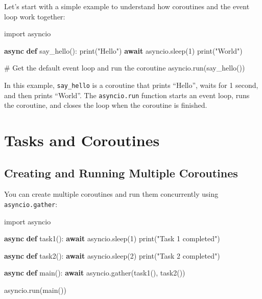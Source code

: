 \documentclass[
  letterpaper,
  DIV=11,
  numbers=noendperiod]{scrreprt}
\newenvironment{Shaded}{\begin{snugshade}}{\end{snugshade}}
\newcommand{\BuiltInTok}[1]{\textcolor[rgb]{0.00,0.23,0.31}{#1}}
\newcommand{\CommentTok}[1]{\textcolor[rgb]{0.37,0.37,0.37}{#1}}
\newcommand{\ControlFlowTok}[1]{\textcolor[rgb]{0.00,0.23,0.31}{\textbf{#1}}}
\newcommand{\DecValTok}[1]{\textcolor[rgb]{0.68,0.00,0.00}{#1}}
\newcommand{\ImportTok}[1]{\textcolor[rgb]{0.00,0.46,0.62}{#1}}
\newcommand{\KeywordTok}[1]{\textcolor[rgb]{0.00,0.23,0.31}{\textbf{#1}}}
\newcommand{\NormalTok}[1]{\textcolor[rgb]{0.00,0.23,0.31}{#1}}
\newcommand{\StringTok}[1]{\textcolor[rgb]{0.13,0.47,0.30}{#1}}
\begin{document}
Let's start with a simple example to understand how coroutines and the
event loop work together:

\begin{Shaded}
\begin{Highlighting}[]
\ImportTok{import}\NormalTok{ asyncio}

\ControlFlowTok{async} \KeywordTok{def}\NormalTok{ say\_hello():}
    \BuiltInTok{print}\NormalTok{(}\StringTok{"Hello"}\NormalTok{)}
    \ControlFlowTok{await}\NormalTok{ asyncio.sleep(}\DecValTok{1}\NormalTok{)}
    \BuiltInTok{print}\NormalTok{(}\StringTok{"World"}\NormalTok{)}

\CommentTok{\# Get the default event loop and run the coroutine}
\NormalTok{asyncio.run(say\_hello())}
\end{Highlighting}
\end{Shaded}

In this example, \texttt{say\_hello} is a coroutine that prints
``Hello'', waits for 1 second, and then prints ``World''. The
\texttt{asyncio.run} function starts an event loop, runs the coroutine,
and closes the loop when the coroutine is finished.

\section{Tasks and Coroutines}\label{tasks-and-coroutines}

\subsection{Creating and Running Multiple
Coroutines}\label{creating-and-running-multiple-coroutines}

You can create multiple coroutines and run them concurrently using
\texttt{asyncio.gather}:

\begin{Shaded}
\begin{Highlighting}[]
\ImportTok{import}\NormalTok{ asyncio}

\ControlFlowTok{async} \KeywordTok{def}\NormalTok{ task1():}
    \ControlFlowTok{await}\NormalTok{ asyncio.sleep(}\DecValTok{1}\NormalTok{)}
    \BuiltInTok{print}\NormalTok{(}\StringTok{"Task 1 completed"}\NormalTok{)}

\ControlFlowTok{async} \KeywordTok{def}\NormalTok{ task2():}
    \ControlFlowTok{await}\NormalTok{ asyncio.sleep(}\DecValTok{2}\NormalTok{)}
    \BuiltInTok{print}\NormalTok{(}\StringTok{"Task 2 completed"}\NormalTok{)}

\ControlFlowTok{async} \KeywordTok{def}\NormalTok{ main():}
    \ControlFlowTok{await}\NormalTok{ asyncio.gather(task1(), task2())}

\NormalTok{asyncio.run(main())}
\end{Highlighting}
\end{Shaded}
\end{document}
